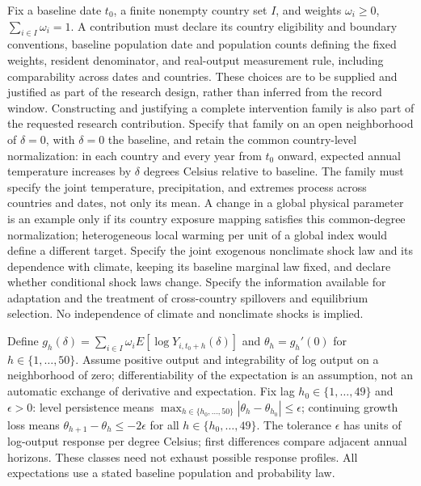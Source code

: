 \documentclass[11pt,a4paper]{article}
\begin{document}
Fix a baseline date \(t_0\), a finite nonempty country set \(I\), and weights \(\omega_i\geq0\), \(\sum_{i\in I}\omega_i=1\). A contribution must declare its country eligibility and boundary conventions, baseline population date and population counts defining the fixed weights, resident denominator, and real-output measurement rule, including comparability across dates and countries. These choices are to be supplied and justified as part of the research design, rather than inferred from the record window. Constructing and justifying a complete intervention family is also part of the requested research contribution. Specify that family on an open neighborhood of \(\delta=0\), with \(\delta=0\) the baseline, and retain the common country-level normalization: in each country and every year from \(t_0\) onward, expected annual temperature increases by \(\delta\) degrees Celsius relative to baseline. The family must specify the joint temperature, precipitation, and extremes process across countries and dates, not only its mean. A change in a global physical parameter is an example only if its country exposure mapping satisfies this common-degree normalization; heterogeneous local warming per unit of a global index would define a different target. Specify the joint exogenous nonclimate shock law and its dependence with climate, keeping its baseline marginal law fixed, and declare whether conditional shock laws change. Specify the information available for adaptation and the treatment of cross-country spillovers and equilibrium selection. No independence of climate and nonclimate shocks is implied.

Define \(g_h(\delta)=\sum_{i\in I}\omega_iE[\log Y_{i,t_0+h}(\delta)]\) and \(\theta_h=g_h'(0)\) for \(h\in\{1,\ldots,50\}\). Assume positive output and integrability of log output on a neighborhood of zero; differentiability of the expectation is an assumption, not an automatic exchange of derivative and expectation. Fix lag \(h_0\in\{1,\ldots,49\}\) and \(\epsilon>0\): level persistence means \(\max_{h\in\{h_0,\ldots,50\}}|\theta_h-\theta_{h_0}|\leq\epsilon\); continuing growth loss means \(\theta_{h+1}-\theta_h\leq-2\epsilon\) for all \(h\in\{h_0,\ldots,49\}\). The tolerance \(\epsilon\) has units of log-output response per degree Celsius; first differences compare adjacent annual horizons. These classes need not exhaust possible response profiles. All expectations use a stated baseline population and probability law.
\end{document}
